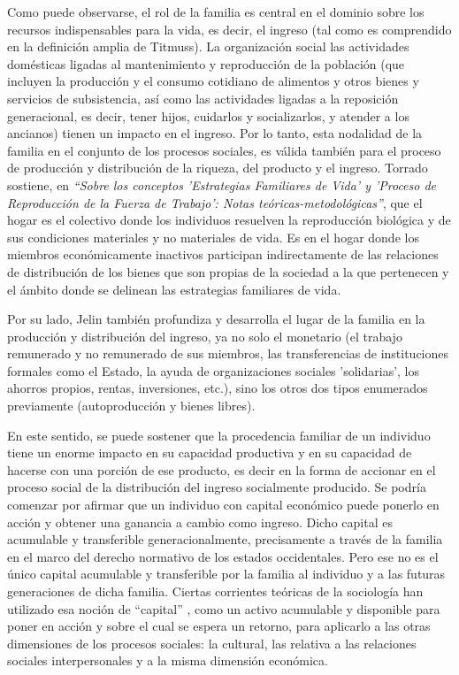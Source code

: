 Como puede observarse, el rol de la familia es central en el dominio sobre los recursos indispensables para la vida, es decir, el ingreso (tal como es comprendido en la definición amplia de Titmuss). La organización social las actividades domésticas ligadas al mantenimiento y reproducción de la población (que incluyen la producción y el consumo cotidiano de alimentos y otros bienes y servicios de subsistencia, así como las actividades ligadas a la reposición generacional, es decir, tener hijos, cuidarlos y socializarlos, y atender a los ancianos) tienen un impacto en el ingreso. Por lo tanto, esta nodalidad de la familia en el conjunto de los procesos sociales, es válida también para el proceso de producción y distribución de la riqueza, del producto y el ingreso. Torrado \citeyear{torrado1981} sostiene, en \textit{“Sobre los conceptos 'Estrategias Familiares de Vida' y 'Proceso de Reproducción de la Fuerza de Trabajo': Notas teóricas-metodológicas”}, que el hogar es el colectivo donde los individuos resuelven la reproducción biológica y de sus condiciones materiales y no materiales de vida. Es en el hogar donde los miembros económicamente inactivos participan indirectamente de las relaciones de distribución de los bienes que son propias de la sociedad a la que pertenecen y el ámbito donde se delinean las estrategias familiares de vida. 
	
Por su lado, Jelin \cite[p.~79]{jelin} también profundiza y desarrolla el lugar de la familia en la producción y distribución del ingreso, ya no solo el monetario (el trabajo remunerado y no remunerado de sus miembros, las transferencias de instituciones formales como el Estado, la ayuda de organizaciones sociales 'solidarias', los ahorros propios, rentas, inversiones, etc.), sino los otros dos tipos enumerados previamente (autoproducción y bienes libres).
	
En este sentido, se puede sostener que la procedencia familiar de un individuo tiene un enorme impacto en su capacidad productiva y en su capacidad de hacerse con una porción de ese producto, es decir en la forma de accionar en el proceso social de la distribución del ingreso socialmente producido. Se podría comenzar por afirmar que un individuo con capital económico puede ponerlo en acción y obtener una ganancia a cambio como ingreso. Dicho capital es acumulable y transferible generacionalmente, precisamente a través de la familia en el marco del derecho normativo de los estados occidentales. Pero ese no es el único capital acumulable y transferible por la familia al individuo y a las futuras generaciones de dicha familia. Ciertas corrientes teóricas de la sociología han utilizado esa noción de “capital” \cite{bourdieu2001}, como un activo acumulable y disponible para poner en acción y sobre el cual se espera un retorno, para aplicarlo a las otras dimensiones de los procesos sociales: la cultural, las relativa a las relaciones sociales interpersonales y a la misma dimensión económica.
	
